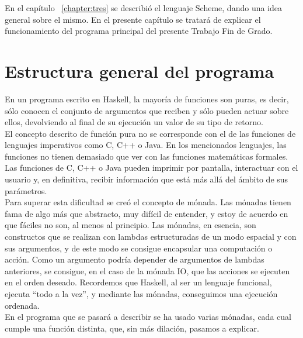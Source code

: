 

En el cap\'itulo ~\ref{chapter:tres} se describi\'o el lenguaje Scheme, dando una idea general sobre el mismo. En el presente cap\'itulo se tratar\'a de explicar el funcionamiento del programa principal del presente Trabajo Fin de Grado.\\

\section{Estructura general del programa}
\label{3:sec1}

En un programa escrito en Haskell, la mayor\'ia de funciones son puras, es decir, s\'olo conocen el conjunto de argumentos que reciben y s\'olo pueden actuar sobre ellos, devolviendo al final de su ejecuci\'on un valor de su tipo de retorno.\\

El concepto descrito de funci\'on pura no se corresponde con el de las funciones de lenguajes imperativos como C, C++ o Java. En los mencionados lenguajes, las funciones no tienen demasiado que ver con las funciones matem\'aticas formales. Las funciones de C, C++ o Java pueden imprimir por pantalla, interactuar con el usuario y, en definitiva, recibir informaci\'on que est\'a m\'as all\'a del \'ambito de sus par\'ametros.\\

Para superar esta dificultad se cre\'o el concepto de m\'onada. Las m\'onadas tienen fama de algo m\'as que abstracto, muy dif\'icil de entender, y estoy de acuerdo en que f\'aciles no son, al menos al principio. Las m\'onadas, en esencia, son constructos que se realizan con lambdas estructuradas de un modo espacial y con sus argumentos, y de este modo se consigue encapsular una computaci\'on o acci\'on. Como un argumento podr\'ia depender de argumentos de lambdas anteriores, se consigue, en el caso de la m\'onada IO, que las acciones se ejecuten en el orden deseado. Recordemos que Haskell, al ser un lenguaje funcional, ejecuta ``todo a la vez'', y mediante las m\'onadas, conseguimos una ejecuci\'on ordenada.\\

En el programa que se pasar\'a a describir se ha usado varias m\'onadas, cada cual cumple una funci\'on distinta, que, sin m\'as dilaci\'on, pasamos a explicar.\\

